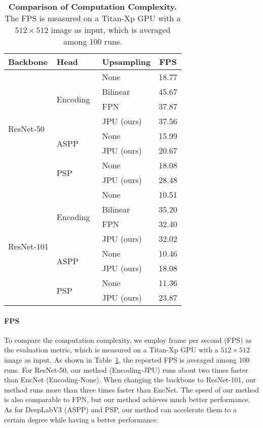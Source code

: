 \documentclass[10pt,twocolumn,letterpaper]{article}
\begin{document}
\begin{table}
\begin{center}
\begin{tabular}{l|l|l|c}
\hline
Backbone & Head & Upsampling & FPS\\
\hline
\multirow{8}{*}{ResNet-50} & \multirow{4}{*}{Encoding~\cite{zhang2018context}} & None & 18.77\\
 &  & Bilinear & \cellcolor{First}45.67\\
 &  & FPN~\cite{lin2017feature} & \cellcolor{Second}37.87\\
 &  & JPU (ours) & \cellcolor{Third}37.56\\
\cline{2-4}
 & \multirow{2}{*}{ASPP~\cite{chen2017rethinking}} & None & 15.99\\
 & & JPU (ours) & 20.67\\
\cline{2-4}
 & \multirow{2}{*}{PSP~\cite{zhao2017pyramid}} & None & 18.08\\
 &  & JPU (ours) & 28.48\\
\hline
\hline
\multirow{8}{*}{ResNet-101} & \multirow{4}{*}{Encoding~\cite{zhang2018context}} & None & 10.51\\
 & & Bilinear & \cellcolor{First}35.20\\
 & & FPN~\cite{lin2017feature} & \cellcolor{Second}32.40\\
 & & JPU (ours) & \cellcolor{Third}32.02\\
\cline{2-4}
 & \multirow{2}{*}{ASPP~\cite{chen2017rethinking}} & None & 10.46\\
 &  & JPU (ours) & 18.08\\
\cline{2-4}
 & \multirow{2}{*}{PSP~\cite{zhao2017pyramid}} & None & 11.36\\
 &  & JPU (ours) & 23.87\\ 
\hline
\end{tabular}
\end{center}
	\caption{\textbf{Comparison of Computation Complexity.} The FPS is measured on a Titan-Xp GPU with a $512\times 512$ image as input, which is averaged among 100 runs.}
	\label{table:speed}
\end{table}
\vspace{-1em}
\paragraph{FPS}
To compare the computation complexity, we employ frame per second (FPS) as the evaluation metric, which is measured on a Titan-Xp GPU with a $512\times 512$ image as input.
As shown in Table~\ref{table:speed}, the reported FPS is averaged among 100 runs.
For ResNet-50, our method (Encoding-JPU) runs about two times faster than EncNet (Encoding-None).
When changing the backbone to ResNet-101, our method runs more than three times faster than EncNet.
The speed of our method is also comparable to FPN, but our method achieves much better performance.
As for DeepLabV3 (ASPP) and PSP, our method can accelerate them to a certain degree while having a better performance.
\end{document}
